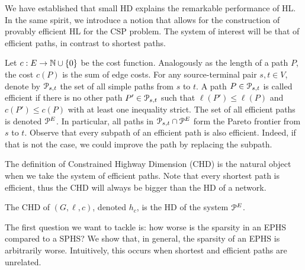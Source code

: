 We have established that small HD explains the remarkable performance of HL.
In the same spirit, we introduce a notion that allows for the construction of provably efficient HL for the CSP problem.
The system of interest will be that of efficient paths, in contrast to shortest paths.

Let $c:E\to \mathbb{N}\cup\{0\}$ be the cost function.
Analogously as the length of a path $P$, the cost $c(P)$ is the sum of edge costs.
For any source-terminal pair $s,t\in V$, denote by $\mathcal{P}_{s,t}$ the set of all simple paths from $s$ to $t$.
A path $P\in \mathcal{P}_{s,t}$ is called efficient if there is no other path $P'\in \mathcal{P}_{s,t}$ such that $\ell(P')\leq \ell(P)$ and $c(P')\leq c(P)$ with at least one inequality strict.
The set of all efficient paths is denoted $\mathcal{P}^E$.
In particular, all paths in $\mathcal{P}_{s,t}\cap\mathcal{P}^E$ form the Pareto frontier from $s$ to $t$.
Observe that every subpath of an efficient path is also efficient.
Indeed, if that is not the case, we could improve the path by replacing the subpath.

The definition of Constrained Highway Dimension (CHD) is the natural object when we take the system of efficient paths.
Note that every shortest path is efficient, thus the CHD will always be bigger than the HD of a network.

\begin{definition}
The CHD of $(G,\ell,c)$, denoted $h_c$, is the HD of the system $\mathcal{P}^E$.
\end{definition}

The first question we want to tackle is: how worse is the sparsity in an EPHS compared to a SPHS?
We show that, in general, the sparsity of an EPHS is arbitrarily worse.
Intuitively, this occurs when shortest and efficient paths are unrelated. 

